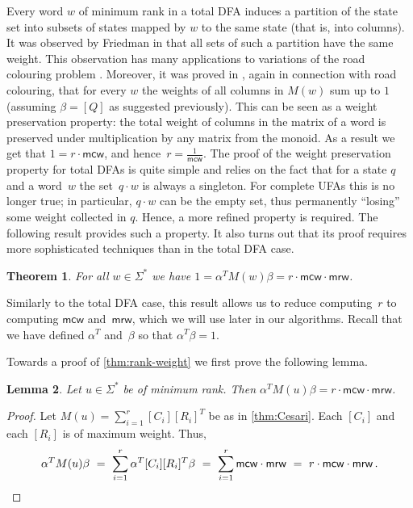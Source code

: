 \documentclass[11pt,a4paper]{amsart}
\newcommand{\mcw}{\mathsf{mcw}}
\newcommand{\mrw}{\mathsf{mrw}}
\theoremstyle{plain}
\newtheorem{thm}{Theorem}[section]
\newtheorem{lem}[thm]{Lemma}
\theoremstyle{definition}
\theoremstyle{defC}
\theoremstyle{thmC}
\theoremstyle{plain}
\numberwithin{equation}{section}
\begin{document}
Every word $w$ of minimum rank in a total DFA induces a partition of the state set into subsets of states mapped by $w$ to the same state (that is, into columns). It was observed by Friedman in \cite{Friedman1990} that all sets of such a partition have the same weight. This observation has many applications to variations of the road colouring problem \cite{Friedman1990,Kari2001,Gusev2016,Kari2019}. Moreover, it was proved in \cite[Theorem 6]{Gusev2016}, again in connection with road colouring, that for every $w$ the weights of all columns in $M(w)$ sum up to $1$ (assuming $\beta = [Q]$ as suggested previously). 
This can be seen as a weight preservation property: the total weight of columns in the matrix of a word is preserved under multiplication by any matrix from the monoid.
As a result we get that $1 = r \cdot \mcw$, and hence~$r = \frac{1}{\mcw}$. The proof of the weight preservation property for total DFAs is quite simple and relies on the fact that for a state $q$ and a word~$w$ the set~$q \cdot w$ is always a singleton. For complete UFAs this is no longer true; in particular, $q \cdot w$ can be the empty set, thus permanently ``losing'' some weight collected in $q$. Hence, a more refined property is required. The following result provides such a property.
It also turns out that its proof requires more sophisticated techniques than in the total DFA case.


\begin{thm} \label{thm:rank-weight}
For all $w \in \Sigma^*$ we have $1 = \alpha^T M(w) \beta = r \cdot \mcw \cdot \mrw$.
\end{thm}

\noindent
Similarly to the total DFA case, this result allows us to reduce computing~$r$ to computing $\mcw$ and~$\mrw$, which we will use later in our algorithms. Recall that we have defined $\alpha^T$ and~$\beta$ so that $\alpha^T \beta = 1$.



Towards a proof of \autoref{thm:rank-weight} we first prove the following lemma.

\begin{lem} \label{lem:minrank-weight}
Let $u \in \Sigma^*$ be of minimum rank.
Then $\alpha^T M(u) \beta = r \cdot \mcw \cdot \mrw$.
\end{lem}
\begin{proof}
Let $M(u) = \sum_{i=1}^r [C_i] [R_i]^T$ be as in \autoref{thm:Cesari}.
Each $[C_i]$ and each $[R_i]$ is of maximum weight.
Thus,
\[
 \alpha^T M(u) \beta \ = \ \sum_{i=1}^r \alpha^T [C_i] [R_i]^T \beta \ = \ \sum_{i=1}^r \mcw \cdot \mrw \ = \ r \cdot \mcw \cdot \mrw\,. \qedhere
\]
\end{proof}
\end{document}
